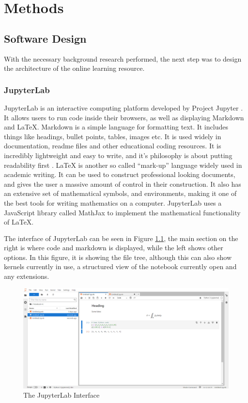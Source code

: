 \chapter{Methods}
\label{chapter2}


\section{Software Design}

With the necessary background research performed, the next step was to design the architecture of the online learning resource.

\subsection{JupyterLab}

JupyterLab is an interactive computing platform developed by Project Jupyter \cite{jupyter}. It allows users to run code inside their browsers, as well as displaying Markdown and LaTeX. Markdown is a simple language for formatting text. It includes things like headings, bullet points, tables, images etc. It is used widely in documentation, readme files and other educational coding resources. It is incredibly lightweight and easy to write, and it's philosophy is about putting readability first \cite{markdown}. LaTeX is another so called ``mark-up'' language widely used in academic writing. It can be used to construct professional looking documents, and gives the user a massive amount of control in their construction. It also has an extensive set of mathematical symbols, and environments, making it one of the best tools for writing mathematics on a computer. JupyterLab uses a JavaScript library called MathJax \cite{mathjax} to implement the mathematical functionality of LaTeX.

The interface of JupyterLab can be seen in Figure \ref{fig:jupyter-lab}, the main section on the right is where code and markdown is displayed, while the left shows other options. In this figure, it is showing the file tree, although this can also show kernels currently in use, a structured view of the notebook currently open and any extensions.

\begin{figure}[h]
\centering
\includegraphics[scale=0.4]{jupyterLab}
\caption{The JupyterLab Interface} \label{fig:jupyter-lab}
\end{figure}

